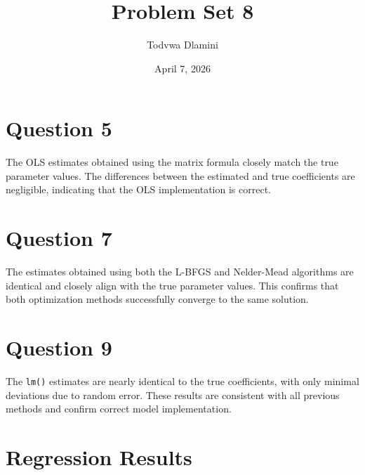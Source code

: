 \documentclass[12pt]{article}
\title{\textbf{Problem Set 8}}
\author{Todvwa Dlamini}
\date{April 7, 2026}
\begin{document}
\maketitle
\onehalfspacing

\section*{Question 5}

The OLS estimates obtained using the matrix formula closely match the true parameter values. The differences between the estimated and true coefficients are negligible, indicating that the OLS implementation is correct.

\vspace{0.5em}

\section*{Question 7}

The estimates obtained using both the L-BFGS and Nelder-Mead algorithms are identical and closely align with the true parameter values. This confirms that both optimization methods successfully converge to the same solution.

\vspace{0.5em}

\section*{Question 9}

The \texttt{lm()} estimates are nearly identical to the true coefficients, with only minimal deviations due to random error. These results are consistent with all previous methods and confirm correct model implementation.

\vspace{1em}

\section*{Regression Results}


\end{document}
